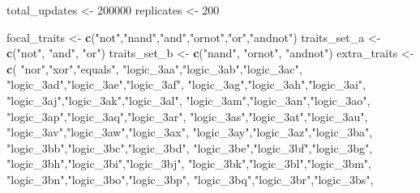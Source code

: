 \documentclass[]{book}
\newenvironment{Shaded}{\begin{snugshade}}{\end{snugshade}}
\newcommand{\DecValTok}[1]{\textcolor[rgb]{0.00,0.00,0.81}{#1}}
\newcommand{\KeywordTok}[1]{\textcolor[rgb]{0.13,0.29,0.53}{\textbf{#1}}}
\newcommand{\NormalTok}[1]{#1}
\newcommand{\StringTok}[1]{\textcolor[rgb]{0.31,0.60,0.02}{#1}}
\begin{document}
\begin{Shaded}
\begin{Highlighting}[]
\NormalTok{total_updates <-}\StringTok{ }\DecValTok{200000}
\NormalTok{replicates <-}\StringTok{ }\DecValTok{200}

\NormalTok{focal_traits <-}\StringTok{ }\KeywordTok{c}\NormalTok{(}\StringTok{"not"}\NormalTok{,}\StringTok{"nand"}\NormalTok{,}\StringTok{"and"}\NormalTok{,}\StringTok{"ornot"}\NormalTok{,}\StringTok{"or"}\NormalTok{,}\StringTok{"andnot"}\NormalTok{)}
\NormalTok{traits_set_a <-}\StringTok{ }\KeywordTok{c}\NormalTok{(}\StringTok{"not"}\NormalTok{, }\StringTok{"and"}\NormalTok{, }\StringTok{"or"}\NormalTok{)}
\NormalTok{traits_set_b <-}\StringTok{ }\KeywordTok{c}\NormalTok{(}\StringTok{"nand"}\NormalTok{, }\StringTok{"ornot"}\NormalTok{, }\StringTok{"andnot"}\NormalTok{)}
\NormalTok{extra_traits <-}\StringTok{ }\KeywordTok{c}\NormalTok{(}
  \StringTok{"nor"}\NormalTok{,}\StringTok{"xor"}\NormalTok{,}\StringTok{"equals"}\NormalTok{,}
  \StringTok{"logic_3aa"}\NormalTok{,}\StringTok{"logic_3ab"}\NormalTok{,}\StringTok{"logic_3ac"}\NormalTok{,}
  \StringTok{"logic_3ad"}\NormalTok{,}\StringTok{"logic_3ae"}\NormalTok{,}\StringTok{"logic_3af"}\NormalTok{,}
  \StringTok{"logic_3ag"}\NormalTok{,}\StringTok{"logic_3ah"}\NormalTok{,}\StringTok{"logic_3ai"}\NormalTok{,}
  \StringTok{"logic_3aj"}\NormalTok{,}\StringTok{"logic_3ak"}\NormalTok{,}\StringTok{"logic_3al"}\NormalTok{,}
  \StringTok{"logic_3am"}\NormalTok{,}\StringTok{"logic_3an"}\NormalTok{,}\StringTok{"logic_3ao"}\NormalTok{,}
  \StringTok{"logic_3ap"}\NormalTok{,}\StringTok{"logic_3aq"}\NormalTok{,}\StringTok{"logic_3ar"}\NormalTok{,}
  \StringTok{"logic_3as"}\NormalTok{,}\StringTok{"logic_3at"}\NormalTok{,}\StringTok{"logic_3au"}\NormalTok{,}
  \StringTok{"logic_3av"}\NormalTok{,}\StringTok{"logic_3aw"}\NormalTok{,}\StringTok{"logic_3ax"}\NormalTok{,}
  \StringTok{"logic_3ay"}\NormalTok{,}\StringTok{"logic_3az"}\NormalTok{,}\StringTok{"logic_3ba"}\NormalTok{,}
  \StringTok{"logic_3bb"}\NormalTok{,}\StringTok{"logic_3bc"}\NormalTok{,}\StringTok{"logic_3bd"}\NormalTok{,}
  \StringTok{"logic_3be"}\NormalTok{,}\StringTok{"logic_3bf"}\NormalTok{,}\StringTok{"logic_3bg"}\NormalTok{,}
  \StringTok{"logic_3bh"}\NormalTok{,}\StringTok{"logic_3bi"}\NormalTok{,}\StringTok{"logic_3bj"}\NormalTok{,}
  \StringTok{"logic_3bk"}\NormalTok{,}\StringTok{"logic_3bl"}\NormalTok{,}\StringTok{"logic_3bm"}\NormalTok{,}
  \StringTok{"logic_3bn"}\NormalTok{,}\StringTok{"logic_3bo"}\NormalTok{,}\StringTok{"logic_3bp"}\NormalTok{,}
  \StringTok{"logic_3bq"}\NormalTok{,}\StringTok{"logic_3br"}\NormalTok{,}\StringTok{"logic_3bs"}\NormalTok{,}

\end{Highlighting}
\end{Shaded}
\end{document}
